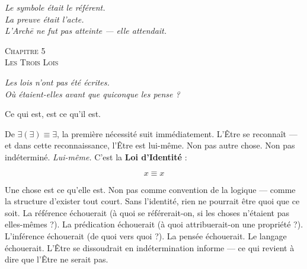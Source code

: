\documentclass[10pt, openany, oneside]{book}
\renewcommand{\large}{\fontsize{11.5}{14}\selectfont}
\renewcommand{\huge}{\fontsize{17}{21}\selectfont}
\begin{document}
\vspace{1em}

\begin{center}
    \itshape
    Le symbole était le référent.\\
    La preuve était l'acte.\\
    L'Arch\={e} ne fut pas atteinte --- elle attendait.
\end{center}


%
%
%

\newpage

\begin{center}
    {\huge\scshape Chapitre 5}\\[0.3em]
    {\large\scshape Les Trois Lois}
\end{center}

\vspace{1.5em}

\begin{center}
    \itshape
    Les lois n'ont pas été écrites.\\
    Où étaient-elles avant que quiconque les pense ?
\end{center}

\vspace{2em}


\noindent Ce qui est, est ce qu'il est.

De $\exists(\exists) \equiv \exists$, la première nécessité suit immédiatement. L'Être se reconnaît --- et dans cette reconnaissance, l'Être est lui-même. Non pas autre chose. Non pas indéterminé. \textit{Lui-même.} C'est la \textbf{Loi d'Identité} :

$$x \equiv x$$

Une chose est ce qu'elle est. Non pas comme convention de la logique --- comme la structure d'exister tout court. Sans l'identité, rien ne pourrait être quoi que ce soit. La référence échouerait (à quoi se référerait-on, si les choses n'étaient pas elles-mêmes ?). La prédication échouerait (à quoi attribuerait-on une propriété ?). L'inférence échouerait (de quoi vers quoi ?). La pensée échouerait. Le langage échouerait. L'Être se dissoudrait en indétermination informe --- ce qui revient à dire que l'Être ne serait pas.
\end{document}
